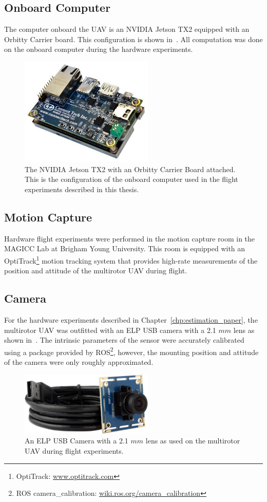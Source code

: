 \subsection{Onboard Computer}
The computer onboard the UAV is an NVIDIA Jetson TX2 equipped with an Orbitty
Carrier board. This configuration is shown in~. All
computation was done on the onboard computer during the hardware experiments.

\begin{figure}[h]
  \centering
  \includegraphics[width=2.5in]{figures/tx2_orbitty.jpg}
  \caption[NVIDIA Jetson TX2 with Orbitty Carrier Board]{The NVIDIA Jetson TX2
  with an Orbitty Carrier Board attached. This is the configuration of the
onboard computer used in the flight experiments described in this thesis.}
%
  \label{fig:tx2_orbitty}
\end{figure}

\subsection{Motion Capture}
Hardware flight experiments were performed in the motion capture room in the
MAGICC Lab at Brigham Young University. This room is equipped with an OptiTrack\footnote{OptiTrack:
\href{www.optitrack.com}{www.optitrack.com}} motion tracking system that
provides high-rate measurements of the position and attitude of the multirotor
UAV during flight.

\subsection{Camera}
For the hardware experiments described in Chapter~\ref{chp:estimation_paper},
the multirotor UAV was outfitted with an ELP USB camera with a 2.1 $mm$ lens as
shown in~. The intrinsic parameters of the sensor were
accurately calibrated using a package provided by ROS\footnote{ROS
camera\_calibration: \href{wiki.ros.org/camera_calibration}{wiki.ros.org/camera\_calibration}},
however, the mounting position and attitude of the camera were only roughly
approximated.

\begin{figure}[h]
  \centering
  \includegraphics[width=2.5in]{figures/camera.jpg}
  \caption[ELP USB Camera with 2.1 $mm$ Lens]{An ELP USB Camera with a 2.1 $mm$
  lens as used on the multirotor UAV during flight experiments.}
%
  \label{fig:camera}
\end{figure}

